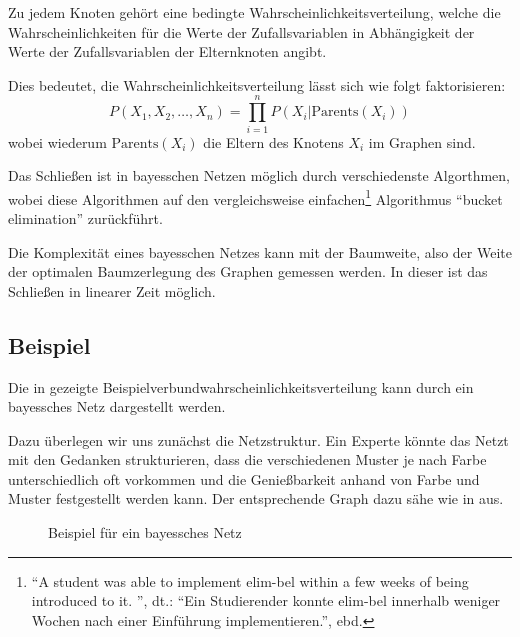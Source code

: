 \documentclass{llncs}
\begin{document}
Zu jedem Knoten gehört eine bedingte Wahrscheinlichkeitsverteilung, welche die Wahrscheinlichkeiten für die Werte der Zufallsvariablen in Abhängigkeit der Werte der Zufallsvariablen der Elternknoten angibt. 

Dies bedeutet, die Wahrscheinlichkeitsverteilung lässt sich wie folgt faktorisieren: 
\[ P(X_1,X_2,\dots,X_n) = \prod_{i=1}^n P(X_i | \mbox{Parents}(X_i)) \]
wobei wiederum $\mbox{Parents}(X_i)$ die Eltern des Knotens $X_i$ im Graphen sind. 

Das Schließen ist in bayesschen Netzen möglich durch verschiedenste Algorthmen, wobei \cite{dechter1996bucket} diese Algorithmen auf den vergleichsweise einfachen\footnote{"`A student was able to implement elim-bel within a few weeks of being introduced to it. "', dt.: "`Ein Studierender konnte elim-bel innerhalb weniger Wochen nach einer Einführung implementieren."', ebd.} Algorithmus "`bucket elimination"' zurückführt. 

Die Komplexität eines bayesschen Netzes kann mit der Baumweite, also der Weite der optimalen Baumzerlegung des Graphen gemessen werden. In dieser ist das Schließen in linearer Zeit möglich. 

\subsection{Beispiel}

Die in  gezeigte Beispielverbundwahrscheinlichkeitsverteilung kann durch ein bayessches Netz dargestellt werden. 

Dazu überlegen wir uns zunächst die Netzstruktur. Ein Experte könnte das Netzt mit den Gedanken strukturieren, dass die verschiedenen Muster je nach Farbe unterschiedlich oft vorkommen und die Genießbarkeit anhand von Farbe und Muster festgestellt werden kann. Der entsprechende Graph dazu sähe wie in  aus.

\begin{figure}[htb]
\caption{\label{fig:bayesnetwork}Beispiel für ein bayessches Netz}
\centering
{}
\end{figure}
\end{document}
